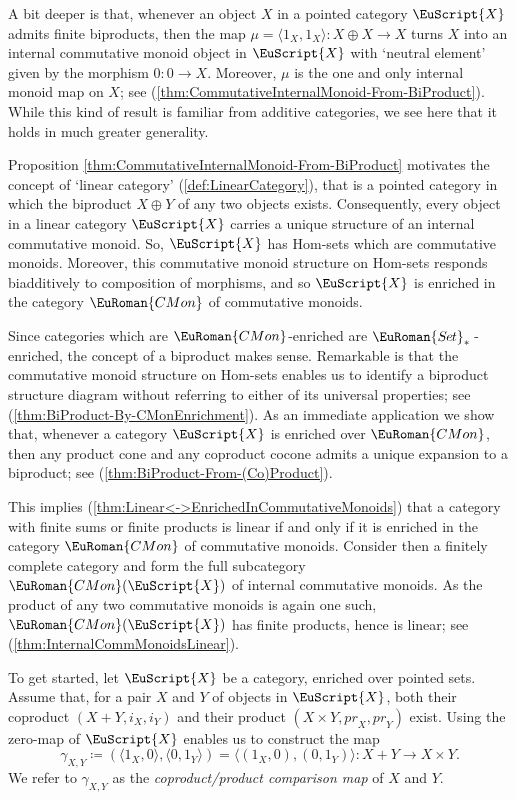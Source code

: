 \documentclass [12pt,oneside]{book}%
\theoremstyle{captionstyle}  %
\newcommand{\Defn}[1]{\emph{#1}}
\newcommand{\DefEq}{\coloneq} 		%
\newcommand{\from}{\colon}				%
\newcommand{\IdMapOn}[1]{1_{#1}}	%
\newcommand{\InclsnOf}[1]{\textit{i}_{#1}}		%
\newcommand{\PrjctnOnto}[1]{\textit{pr}_{#1}} 	%
\newcommand{\SetsBsd}{\EuRoman{S{\kern-0.12ex}e{\hskip-0.14ex}t}_{\ast}\,}	%
\newcommand{\CMon}{\ensuremath{\EuRoman{CMon}}}
\newcommand{\ZeroObject}{0}                           %
\newcommand{\ZeroMap}{0}                                %
\newcommand{\Ctgry}[1]{\EuScript{#1}}					%
\newcommand{\SACtgry}[1]{\EuScript{#1}}			%
\newcommand{\Prdct}[2]{#1 \times #2}	 	%
\newcommand{\PrdctMapInto}[1]{( #1)}			%
\newcommand{\BiPrdct}[2]{#1\oplus #2}
\newcommand{\SumMapOutOf}[1]{\langle #1\rangle}     %
\newcommand{\SumProdComp}[2]{\gamma_{#1,#2}}			%
\begin{document}
A bit deeper is that, whenever an object $X$ in a pointed category $\Ctgry{X}$ admits finite biproducts, then the map $\mu=\SumMapOutOf{\IdMapOn{X},\IdMapOn{X}}\from \BiPrdct{X}{X}\to X$ turns $X$ into an internal commutative monoid object in $\Ctgry{X}$ with `neutral element' given by the morphism $\ZeroMap\from \ZeroObject\to X$. Moreover, $\mu$ is the one and only internal monoid map on $X$; see (\ref{thm:CommutativeInternalMonoid-From-BiProduct}). While this kind of result is familiar from additive categories, we see here that it holds in much greater generality.

Proposition \ref{thm:CommutativeInternalMonoid-From-BiProduct} motivates the concept of `linear category' (\ref{def:LinearCategory}), that is a pointed category in which the biproduct $\BiPrdct{X}{Y}$ of any two objects exists. Consequently, every object in a linear category $\Ctgry{X} $ carries a unique structure of an internal commutative monoid. So, $\Ctgry{X}$ has Hom-sets which are commutative monoids. Moreover, this commutative monoid structure on Hom-sets responds biadditively to composition of morphisms, and so $\Ctgry{X} $ is enriched in the category $\CMon$ of commutative monoids.

Since categories which are $\CMon$\*-enriched are $\SetsBsd$\*-enriched, the concept of a biproduct makes sense. Remarkable is that the commutative monoid structure on Hom-sets enables us to identify a biproduct structure diagram without referring to either of its universal properties; see (\ref{thm:BiProduct-By-CMonEnrichment}). As an immediate application we show that, whenever a category $\SACtgry{X}$ is enriched over $\CMon$, then any product cone and any coproduct cocone admits a unique expansion to a biproduct; see (\ref{thm:BiProduct-From-(Co)Product}).

This implies (\ref{thm:Linear<->EnrichedInCommutativeMonoids}) that a category with finite sums or finite products is linear if and only if it is enriched in the category $\CMon$ of commutative monoids. Consider then a finitely complete category and form the full subcategory $\CMon(\Ctgry{X})$ of internal commutative monoids. As the product of any two commutative monoids is again one such, $\CMon(\Ctgry{X})$ has finite products, hence is linear; see (\ref{thm:InternalCommMonoidsLinear}).

To get started, let $\Ctgry{X}$ be a category, enriched over pointed sets. Assume that, for a pair $X$ and $Y$ of objects in $\Ctgry{X}$, both their coproduct $(X+Y,\InclsnOf{X},\InclsnOf{Y})$ and their product $(\Prdct{X}{Y},\PrjctnOnto{X},\PrjctnOnto{Y})$ exist. Using the zero-map of $\Ctgry{X}$ enables us to construct the map
\begin{equation*}
    \SumProdComp{X}{Y}\DefEq\PrdctMapInto{\SumMapOutOf{\IdMapOn{X},\ZeroMap},\SumMapOutOf{\ZeroMap,\IdMapOn{Y}}} = \SumMapOutOf{\PrdctMapInto{\IdMapOn{X},\ZeroMap}, \PrdctMapInto{\ZeroMap,\IdMapOn{Y}} } \from X+Y \to \Prdct{X}{Y}.
\end{equation*}
We refer to $\SumProdComp{X}{Y}$ as the \Defn{coproduct/product comparison map} of $X$ and $Y$.
\end{document}

